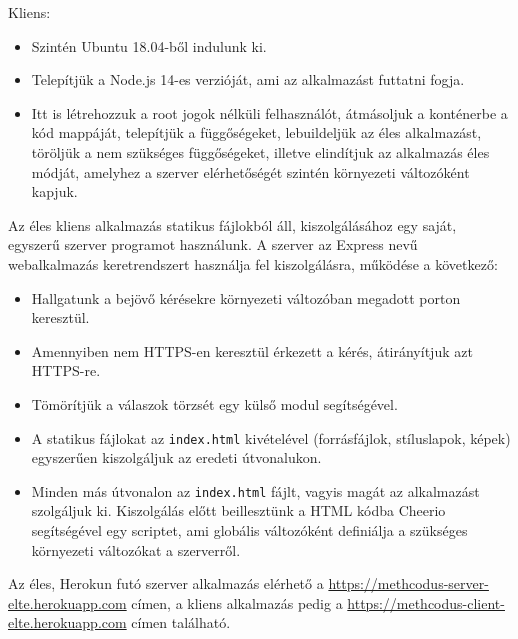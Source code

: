 \documentclass{elteikthesis}
\begin{document}
        Kliens:
        \begin{itemize}
          \setlength\itemsep{-0.5em}
          \item Szintén Ubuntu 18.04-ből indulunk ki.
          \item Telepítjük a Node.js 14-es verzióját, ami az alkalmazást futtatni fogja.
          \item Itt is létrehozzuk a root jogok nélküli felhasználót, átmásoljuk a konténerbe a kód mappáját, telepítjük a függőségeket, lebuildeljük az éles alkalmazást, töröljük a nem szükséges függőségeket, illetve elindítjuk az alkalmazás éles módját, amelyhez a szerver elérhetőségét szintén környezeti változóként kapjuk.
        \end{itemize}

        Az éles kliens alkalmazás statikus fájlokból áll, kiszolgálásához egy saját, egyszerű szerver programot használunk. A szerver az Express nevű webalkalmazás keretrendszert használja fel kiszolgálásra, működése a következő:
        \begin{itemize}
          \setlength\itemsep{-0.5em}
          \item Hallgatunk a bejövő kérésekre környezeti változóban megadott porton keresztül.
          \item Amennyiben nem HTTPS-en keresztül érkezett a kérés, átirányítjuk azt HTTPS-re.
          \item Tömörítjük a válaszok törzsét egy külső modul segítségével.
          \item A statikus fájlokat az \texttt{index.html} kivételével (forrásfájlok, stíluslapok, képek) egyszerűen kiszolgáljuk az eredeti útvonalukon.
          \item Minden más útvonalon az \texttt{index.html} fájlt, vagyis magát az alkalmazást szolgáljuk ki. Kiszolgálás előtt beillesztünk a HTML kódba Cheerio segítségével egy scriptet, ami globális változóként definiálja a szükséges környezeti változókat a szerverről.
        \end{itemize}

        Az éles, Herokun futó szerver alkalmazás elérhető a \url{https://methcodus-server-elte.herokuapp.com} címen, a kliens alkalmazás pedig a \url{https://methcodus-client-elte.herokuapp.com} címen található.
\end{document}
